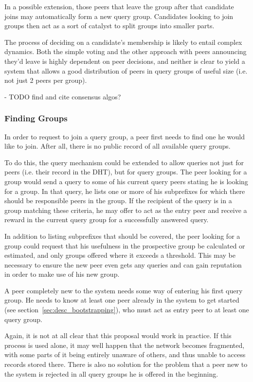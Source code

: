 In a possible extension, those peers that leave the group after that candidate
joins may automatically form a new query group. Candidates looking to join
groups then act as a sort of catalyst to split groups into smaller parts.

The process of deciding on a candidate's membership is likely to entail complex
dynamics. Both the simple voting and the other approach with peers announcing
they'd leave is highly dependent on peer decisions, and neither is clear to
yield a system that allows a good distribution of peers in query groups of
useful size (i.e. not just 2 peers per group).

- TODO find and cite consensus algos?

\subsubsection{Finding Groups}
In order to request to join a query group, a peer first needs to find one he
would like to join. After all, there is no public record of all available query
groups.

To do this, the query mechanism could be extended to allow queries not just for
peers (i.e. their record in the \ac{DHT}), but for query groups. The peer
looking for a group would send a query to some of his current query peers
stating he is looking for a group. In that query, he lists one or more of his
subprefixes for which there should be responsible peers in the group. If the
recipient of the query is in a group matching these criteria, he may offer to
act as the entry peer and receive a reward in the current query group for a
successfully answered query.

In addition to listing subprefixes that should be covered, the peer looking for
a group could request that his usefulness in the prospective group be calculated
or estimated, and only groups offered where it exceeds a threshold. This may be
necessary to ensure the new peer even gets any queries and can gain reputation
in order to make use of his new group.

A peer completely new to the system needs some way of entering his first query
group. He needs to know at least one peer already in the system to get started
(see section~\ref{sec:desc_bootstrapping}), who must act as entry peer to at
least one query group.

Again, it is not at all clear that this proposal would work in practice. If this
process is used alone, it may well happen that the network becomes fragmented,
with some parts of it being entirely unaware of others, and thus unable to
access records stored there. There is also no solution for the problem that a
peer new to the system is rejected in all query groups he is offered in the
beginning.

